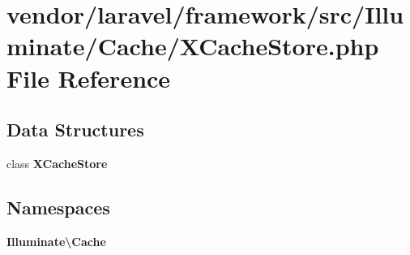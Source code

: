 \section{vendor/laravel/framework/src/\+Illuminate/\+Cache/\+X\+Cache\+Store.php File Reference}
\label{_x_cache_store_8php}
\subsection*{Data Structures}
\begin{DoxyCompactItemize}
\item 
class {\bf X\+Cache\+Store}
\end{DoxyCompactItemize}
\subsection*{Namespaces}
\begin{DoxyCompactItemize}
\item 
 {\bf Illuminate\textbackslash{}\+Cache}
\end{DoxyCompactItemize}
